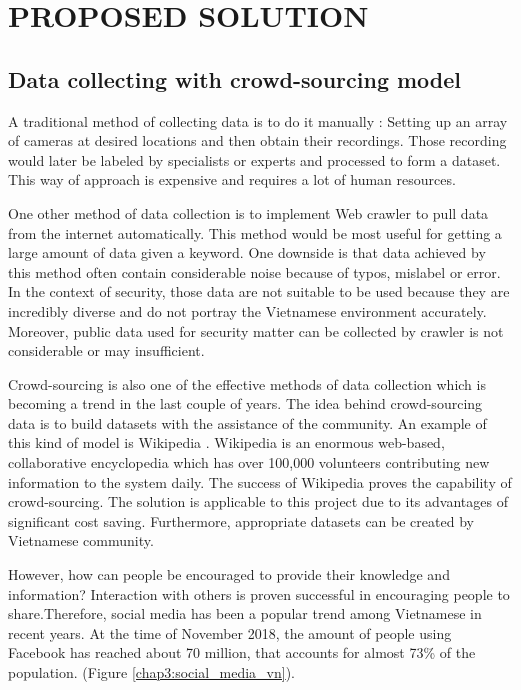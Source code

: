 \chapter{PROPOSED SOLUTION}
\label{chap:solution}
\section{Data collecting with crowd-sourcing model}
A traditional method of collecting data is to do it manually : Setting up an array of cameras at desired locations and then obtain their recordings. Those recording would later be labeled by specialists or experts and processed to form a dataset. This way of approach is expensive and requires a lot of human resources.

One other method of data collection is to implement Web crawler to pull data from the internet automatically. This method would be most useful for getting a large amount of data given a keyword. One downside is that data achieved by this method often contain considerable noise because of typos, mislabel or error. In the context of security, those data are not suitable to be used because they are incredibly diverse and do not portray the Vietnamese environment accurately. Moreover, public data used for security matter can be collected by crawler is not considerable or may insufficient.

Crowd-sourcing is also one of the effective methods of data collection which is becoming a trend in the last couple of years. The idea behind crowd-sourcing data is to build datasets with the assistance of the community. An example of this kind of model is Wikipedia
. Wikipedia is an enormous web-based, collaborative encyclopedia which has over 100,000 volunteers contributing new information to the system daily. The success of Wikipedia proves the capability of crowd-sourcing. The solution is applicable to this project due to its advantages of significant cost saving. Furthermore, appropriate datasets can be created by Vietnamese community.

However, how can people be encouraged to provide their knowledge and information? Interaction with others is proven successful in encouraging people to share.Therefore, social media has been a popular trend among Vietnamese in recent years. At the time of November 2018, the amount of people using Facebook has reached about 70 million, that accounts for almost 73\% of the population. (Figure \ref{chap3:social_media_vn}).

